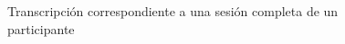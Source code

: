 \begin{figure}[h!]
        \centering
        \caption{Transcripci\'on correspondiente a una sesi\'on completa de un participante}\label{fig:f5transcript}
\end{figure}



